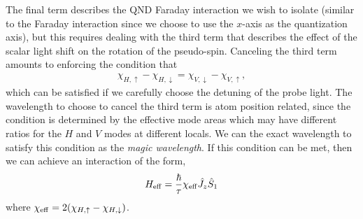 \documentclass[]{report}
\begin{document}
The final term describes the QND Faraday interaction we wish to isolate (similar to the Faraday interaction since we choose to use the $ x $-axis as the quantization axis), but this requires dealing with the third term that describes the effect of the scalar light shift on the rotation of the pseudo-spin.  Canceling the third term amounts to enforcing the condition that
	\begin{align}
		\chi_{H,\uparrow} - \chi_{H,\downarrow} = \chi_{V,\downarrow} - \chi_{V,\uparrow} ,
	\end{align}
which can be satisfied if we carefully choose the detuning of the probe light. The wavelength to choose to cancel the third term is atom position related, since the condition is determined by the effective mode areas which may have different ratios for the $ H $ and $ V $ modes at different locals. We can the exact wavelength to satisfy this condition as the \textit{magic wavelength}. If this condition can be met, then we can achieve an interaction of the form,
\begin{align}
	H_{\rm eff} = \frac{\hbar}{\tau} \chi_{\rm eff} \hat{J}_z \hat{S}_1
\end{align}
where $\chi_{\rm eff} = 2(\chi_{H,\uparrow} - \chi_{H,\downarrow})$.  
\end{document}
